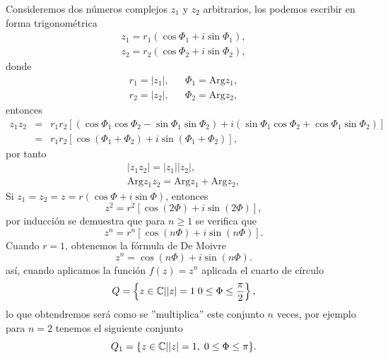 Consideremos dos números complejos $z_1$ y $z_2$ arbitrarios, los podemos escribir en forma trigonométrica
\[
	\begin{array}{c}
		z_1=r_1(\cos\Phi_1+i\sin\Phi_1),\\
		z_2=r_2(\cos\Phi_2+i\sin\Phi_2),
	\end{array}
\]
donde 
\[
	\begin{array}{ccl}
		r_1=|z_1|,&&\Phi_1=\mbox{Arg}z_1,\\
		r_2=|z_2|,&&\Phi_2=\mbox{Arg}z_2,
	\end{array}
\]
entonces 
\[
	\begin{array}{ccl}
		z_1z_2&=&r_1r_2[(\cos\Phi_1\cos\Phi_2-\sin\Phi_1\sin\Phi_2)+i(\sin\Phi_1\cos\Phi_2+\cos\Phi_1\sin\Phi_2)]\\
		&=&r_1r_2[\cos(\Phi_1+\Phi_2)+i\sin(\Phi_1+\Phi_2)],
	\end{array}
\]
por tanto
\[
\begin{array}{c}
	|z_1z_2|=|z_1||z_2|,\\
	\mbox{Arg}z_1z_2=\mbox{Arg}z_1+\mbox{Arg}z_2,
\end{array}
\]
Si $z_1=z_2=z=r(\cos\Phi+i\sin\Phi)$, entonces
$$z^2=r^2[\cos(2\Phi)+i\sin(2\Phi)],$$ 
por inducción se demuestra que para $n\geq 1$ se verifica que 
$$z^n=r^n[\cos(n\Phi)+i\sin(n\Phi)].$$
Cuando $r=1$, obtenemos la fórmula de De Moivre
$$z^n=\cos(n\Phi)+i\sin(n\Phi).$$
así, cuando aplicamos la función $f(z)=z^n$ aplicada el cuarto de círculo $$Q=\left\{z\in \mathbb{C} | |z|=1\; 0\leq \Phi\leq \dfrac{\pi}{2}\right\},$$
lo que obtendremos será como se ''multiplica'' este conjunto $n$ veces, por ejemplo para $n=2$ tenemos el siguiente conjunto
$$Q_1=\{z\in \mathbb{C} | |z|=1,\; 0\leq \Phi\leq \pi\}.$$
